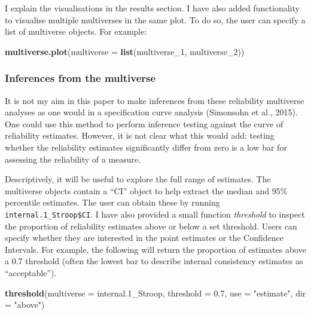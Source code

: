 \documentclass[
  english,
  man,floatsintext]{apa6}
\newenvironment{Shaded}{\begin{snugshade}}{\end{snugshade}}
\newcommand{\DataTypeTok}[1]{\textcolor[rgb]{0.13,0.29,0.53}{#1}}
\newcommand{\DecValTok}[1]{\textcolor[rgb]{0.00,0.00,0.81}{#1}}
\newcommand{\FloatTok}[1]{\textcolor[rgb]{0.00,0.00,0.81}{#1}}
\newcommand{\KeywordTok}[1]{\textcolor[rgb]{0.13,0.29,0.53}{\textbf{#1}}}
\newcommand{\NormalTok}[1]{#1}
\newcommand{\StringTok}[1]{\textcolor[rgb]{0.31,0.60,0.02}{#1}}
\begin{document}
I explain the visualisations in the results section. I have also added functionality to visualise multiple multiverses in the same plot. To do so, the user can specify a list of multiverse objects. For example:

\begin{Shaded}
\begin{Highlighting}[]
\KeywordTok{multiverse.plot}\NormalTok{(}\DataTypeTok{multiverse =} \KeywordTok{list}\NormalTok{(multiverse_}\DecValTok{1}\NormalTok{,}
\NormalTok{                                  multiverse_}\DecValTok{2}\NormalTok{))}
\end{Highlighting}
\end{Shaded}

\hypertarget{inferences-from-the-multiverse}{%
\subsubsection{Inferences from the multiverse}\label{inferences-from-the-multiverse}}

It is not my aim in this paper to make inferences from these reliability multiverse analyses as one would in a specification curve analysis (Simonsohn et al., 2015). One could use this method to perform inference testing against the curve of reliability estimates. However, it is not clear what this would add: testing whether the reliability estimates significantly differ from zero is a low bar for assessing the reliability of a measure.

Descriptively, it will be useful to explore the full range of estimates. The multiverse objects contain a \enquote{CI} object to help extract the median and 95\% percentile estimates. The user can obtain these by running \texttt{internal.1\_Stroop\$CI}. I have also provided a small function \emph{threshold} to inspect the proportion of reliability estimates above or below a set threshold. Users can specify whether they are interested in the point estimates or the Confidence Intervals. For example, the following will return the proportion of estimates above a 0.7 threshold (often the lowest bar to describe internal consistency estimates as \enquote{acceptable}).

\begin{Shaded}
\begin{Highlighting}[]
\KeywordTok{threshold}\NormalTok{(}\DataTypeTok{multiverse =}\NormalTok{ internal}\FloatTok{.1}\NormalTok{_Stroop,}
          \DataTypeTok{threshold =} \FloatTok{0.7}\NormalTok{,}
          \DataTypeTok{use =} \StringTok{"estimate"}\NormalTok{,}
          \DataTypeTok{dir =} \StringTok{"above"}\NormalTok{)}
\end{Highlighting}
\end{Shaded}
\end{document}
